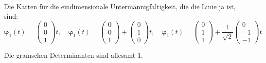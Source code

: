 \documentclass[11pt, ngerman]{article}
\renewcommand{\vec}[1]{\boldsymbol{#1}}
\begin{document}
Die Karten für die eindimensionale Untermannigfaltigkeit, die die Linie ja ist, sind:
\[
	\vec\varphi_1(t) = \begin{pmatrix}
		0 \\ 0 \\ 1
	\end{pmatrix} t
	,\quad
	\vec\varphi_1(t) = \begin{pmatrix}
		0 \\ 0 \\ 1
	\end{pmatrix} + \begin{pmatrix}
		0 \\ 1 \\ 0
	\end{pmatrix} t
	,\quad
	\vec\varphi_1(t) = \begin{pmatrix}
		0 \\ 1 \\ 1
	\end{pmatrix} + \frac{1}{\sqrt{2}} \begin{pmatrix}
		0 \\ -1 \\ -1
	\end{pmatrix} t
\]

Die gramschen Determinanten sind allesamt $1$.
\end{document}
